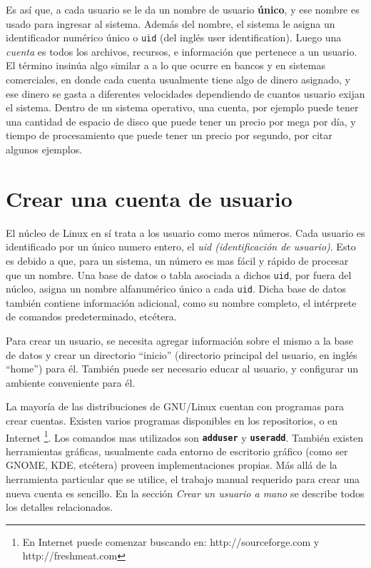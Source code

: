 \documentclass[12pt]{article}
\begin{document}
Es así que, a cada usuario se le da un nombre de usuario 
\textbf{único}, y ese nombre es
usado para ingresar al sistema. Además del nombre, el sistema le asigna 
un identificador numérico único o \texttt{uid} (del inglés user identification). 
Luego una \textit{cuenta} es todos los archivos, recursos, e información 
que pertenece a un usuario. El término insinúa algo similar a 
a lo que ocurre en bancos y en sistemas comerciales, en donde cada cuenta 
usualmente tiene algo de dinero asignado, y ese dinero se gasta a 
diferentes velocidades dependiendo de cuantos usuario exijan el sistema.
Dentro de un sistema operativo, una cuenta, por ejemplo  puede tener una 
cantidad de espacio de disco que puede tener un precio por mega por día, y
tiempo de procesamiento que puede tener un precio por segundo, por citar algunos
ejemplos. 

\section{ Crear una cuenta de usuario}
El núcleo de Linux en sí trata a los usuario como meros números. Cada
usuario es identificado por un único numero entero, el \textit{uid
(identificación de usuario)}. Esto es debido a que, para un sistema, un número es mas fácil
y rápido de procesar que un nombre. Una base de datos o tabla
asociada a dichos \texttt{uid}, por fuera del núcleo, asigna un nombre alfanumérico 
único a cada \texttt{uid}. Dicha base de datos también contiene información adicional, 
como su nombre completo, el intérprete de comandos predeterminado, etcétera. 

Para crear un usuario, se necesita agregar información sobre el mismo a la
base de datos y crear un directorio ``inicio'' (directorio principal
del usuario, en inglés ``home'') para él. También puede ser necesario educar al 
usuario, y configurar un ambiente conveniente para él.

La mayoría de las distribuciones de GNU/Linux cuentan con programas para crear
cuentas. Existen varios programas disponibles en los repositorios,
o en Internet \footnote{En Internet puede comenzar buscando en:
http://sourceforge.com y http://freshmeat.com}.  
Los comandos mas utilizados son \texttt{\textbf{adduser}} y
\texttt{\textbf{useradd}}. También existen herramientas gráficas, usualmente 
cada entorno de escritorio gráfico (como ser GNOME, KDE, etcétera) proveen  
implementaciones propias. Más allá de la herramienta particular que se utilice,  
el trabajo manual requerido para crear una nueva cuenta es sencillo. En la sección
\textit{Crear un usuario a mano} se describe todos los detalles relacionados.
\end{document}
